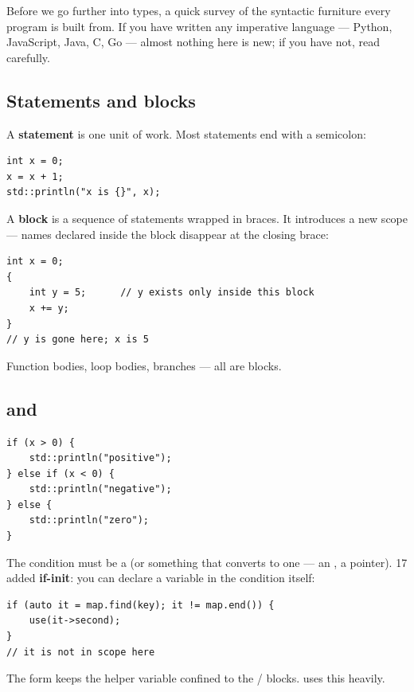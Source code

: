 Before we go further into types, a quick survey of the syntactic
furniture every \cpp{} program is built from. If you have written
any imperative language --- Python, JavaScript, Java, C, Go ---
almost nothing here is new; if you have not, read carefully.

\subsection{Statements and blocks}

A \textbf{statement} is one unit of work. Most statements end with a
semicolon:

\begin{lstlisting}
int x = 0;
x = x + 1;
std::println("x is {}", x);
\end{lstlisting}

A \textbf{block} is a sequence of statements wrapped in braces. It
introduces a new scope --- names declared inside the block disappear
at the closing brace:

\begin{lstlisting}
int x = 0;
{
    int y = 5;      // y exists only inside this block
    x += y;
}
// y is gone here; x is 5
\end{lstlisting}

Function bodies, loop bodies,  branches --- all are blocks.

\subsection{ and }

\begin{lstlisting}
if (x > 0) {
    std::println("positive");
} else if (x < 0) {
    std::println("negative");
} else {
    std::println("zero");
}
\end{lstlisting}

The condition must be a  (or something that converts to
one --- an , a pointer). \cpp{}17 added \textbf{if-init}:
you can declare a variable in the condition itself:

\begin{lstlisting}
if (auto it = map.find(key); it != map.end()) {
    use(it->second);
}
// it is not in scope here
\end{lstlisting}

The form  keeps the helper variable confined
to the / blocks. \maya{} uses this heavily.

